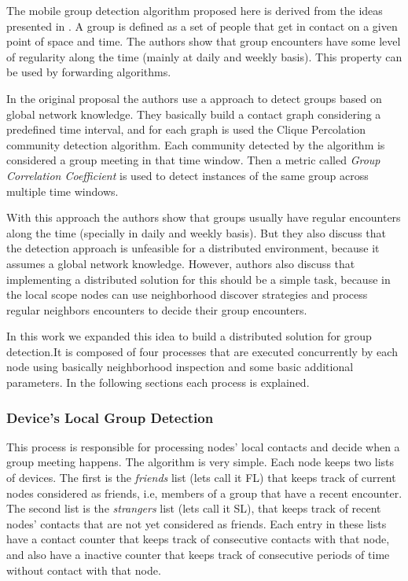 The mobile group detection algorithm proposed here is derived from the ideas presented in \cite{groupMobility}.
A group is defined as a set of people that get in contact on a given point of space and time. The authors show that
group encounters have some level of regularity along the time (mainly at daily and weekly basis). This property can be used by forwarding algorithms. 

In the original proposal the authors use a approach to detect groups based on global network knowledge. They basically
build a contact graph considering a predefined time interval, and for each graph is used the Clique Percolation community
detection algorithm. Each community detected by the algorithm is considered a group meeting in that time window. Then
a metric called \textit{Group Correlation Coefficient} is used to detect instances of the same group across multiple time
windows.

With this approach the authors show that groups usually have regular encounters along the time (specially in daily and weekly basis).
But they also discuss that the detection approach is unfeasible for a distributed environment, because it assumes a global network
knowledge. However, authors also discuss that implementing a distributed solution for this should be a simple task, because in the local
scope nodes can use neighborhood discover strategies and process regular neighbors encounters to decide their group encounters.

In this work we expanded this idea to build a distributed solution for group detection.It is composed of four processes
that are executed concurrently by each node using basically neighborhood inspection and some basic additional parameters. In the following sections each process is explained.

\subsubsection{Device's Local Group Detection}

This process is responsible for processing nodes' local contacts and decide when a group meeting happens.
The algorithm is very simple. Each node keeps two lists of devices. The first is the \textit{friends} list (lets call it FL) 
that keeps track of current nodes considered as friends, i.e, members of a group that have a recent encounter.
The second list is the \textit{strangers} list (lets call it SL), that keeps track of recent nodes' contacts that are not yet 
considered as friends. Each entry in these lists have a contact counter that keeps track of consecutive
contacts with that node, and also have a inactive counter that keeps track of consecutive periods of time
without contact with that node.

